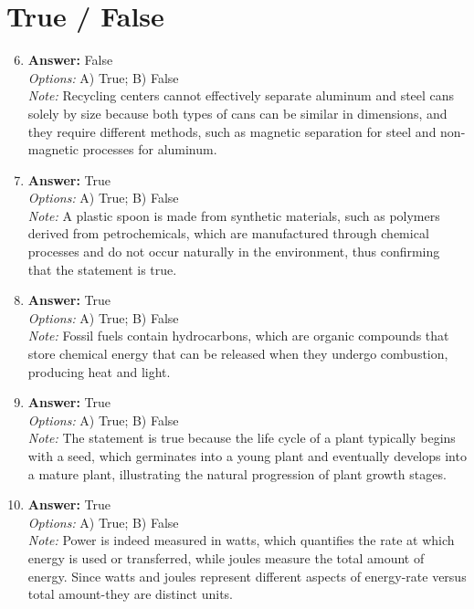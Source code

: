 \documentclass[12pt]{article}
\begin{document}
\section*{True / False}
\begin{enumerate}[label=\arabic*.]
\setcounter{enumi}{5}
\item \textbf{Answer:} False
\\ \textit{Options:} A) True; B) False
\\ \textit{Note:} Recycling centers cannot effectively separate aluminum and steel cans solely by size because both types of cans can be similar in dimensions, and they require different methods, such as magnetic separation for steel and non-magnetic processes for aluminum.
\item \textbf{Answer:} True
\\ \textit{Options:} A) True; B) False
\\ \textit{Note:} A plastic spoon is made from synthetic materials, such as polymers derived from petrochemicals, which are manufactured through chemical processes and do not occur naturally in the environment, thus confirming that the statement is true.
\item \textbf{Answer:} True
\\ \textit{Options:} A) True; B) False
\\ \textit{Note:} Fossil fuels contain hydrocarbons, which are organic compounds that store chemical energy that can be released when they undergo combustion, producing heat and light.
\item \textbf{Answer:} True
\\ \textit{Options:} A) True; B) False
\\ \textit{Note:} The statement is true because the life cycle of a plant typically begins with a seed, which germinates into a young plant and eventually develops into a mature plant, illustrating the natural progression of plant growth stages.
\item \textbf{Answer:} True
\\ \textit{Options:} A) True; B) False
\\ \textit{Note:} Power is indeed measured in watts, which quantifies the rate at which energy is used or transferred, while joules measure the total amount of energy. Since watts and joules represent different aspects of energy-rate versus total amount-they are distinct units.
\end{enumerate}
\end{document}
